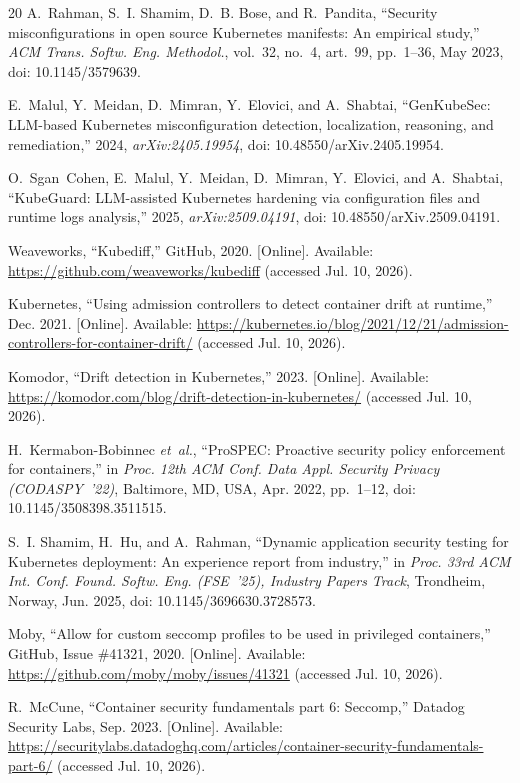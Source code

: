 \documentclass[conference]{IEEEtran}
\begin{document}
\begin{thebibliography}{20}
A.~Rahman, S.~I. Shamim, D.~B. Bose, and R.~Pandita, ``Security misconfigurations in open source Kubernetes manifests: An empirical study,'' \emph{ACM Trans. Softw. Eng. Methodol.}, vol.~32, no.~4, art.~99, pp.~1--36, May 2023, doi: 10.1145/3579639.

E.~Malul, Y.~Meidan, D.~Mimran, Y.~Elovici, and A.~Shabtai, ``GenKubeSec: LLM-based Kubernetes misconfiguration detection, localization, reasoning, and remediation,'' 2024, \emph{arXiv:2405.19954}, doi: 10.48550/arXiv.2405.19954.

O.~Sgan~Cohen, E.~Malul, Y.~Meidan, D.~Mimran, Y.~Elovici, and A.~Shabtai, ``KubeGuard: LLM-assisted Kubernetes hardening via configuration files and runtime logs analysis,'' 2025, \emph{arXiv:2509.04191}, doi: 10.48550/arXiv.2509.04191.

Weaveworks, ``Kubediff,'' GitHub, 2020. [Online]. Available: \url{https://github.com/weaveworks/kubediff} (accessed Jul. 10, 2026).

Kubernetes, ``Using admission controllers to detect container drift at runtime,'' Dec. 2021. [Online]. Available: \url{https://kubernetes.io/blog/2021/12/21/admission-controllers-for-container-drift/} (accessed Jul. 10, 2026).

Komodor, ``Drift detection in Kubernetes,'' 2023. [Online]. Available: \url{https://komodor.com/blog/drift-detection-in-kubernetes/} (accessed Jul. 10, 2026).

H.~Kermabon-Bobinnec \emph{et~al.}, ``ProSPEC: Proactive security policy enforcement for containers,'' in \emph{Proc. 12th ACM Conf. Data Appl. Security Privacy (CODASPY~'22)}, Baltimore, MD, USA, Apr. 2022, pp.~1--12, doi: 10.1145/3508398.3511515.

S.~I. Shamim, H.~Hu, and A.~Rahman, ``Dynamic application security testing for Kubernetes deployment: An experience report from industry,'' in \emph{Proc. 33rd ACM Int. Conf. Found. Softw. Eng. (FSE~'25), Industry Papers Track}, Trondheim, Norway, Jun. 2025, doi: 10.1145/3696630.3728573.

Moby, ``Allow for custom seccomp profiles to be used in privileged containers,'' GitHub, Issue \#41321, 2020. [Online]. Available: \url{https://github.com/moby/moby/issues/41321} (accessed Jul. 10, 2026).

R.~McCune, ``Container security fundamentals part 6: Seccomp,'' Datadog Security Labs, Sep. 2023. [Online]. Available: \url{https://securitylabs.datadoghq.com/articles/container-security-fundamentals-part-6/} (accessed Jul. 10, 2026).


\end{thebibliography}
\end{document}
